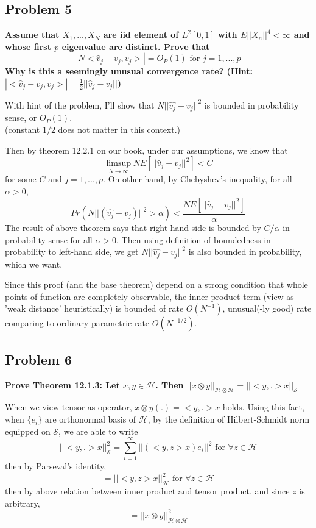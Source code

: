 \documentclass{article}
\begin{document}
\subsection{Problem 5}
\textbf{
Assume that $X_1,...,X_N$ are iid element of $L^2[0,1]$ with
$E||X_n||^4<\infty$ and whose first $p$ eigenvalue are distinct.
Prove that
\[|N<\hat{v}_j-v_j,v_j>|=O_P(1) \text{ for } j=1,...,p\]
Why is this a seemingly unusual convergence rate? 
(Hint: \(|<\hat{v}_j-v_j,v_j>|=\frac{1}{2}||\hat{v}_j-v_j||\))
}

With hint of the problem, I'll show that
\(N||\hat{v_j}-v_j||^2\) is bounded in probability sense, or $O_P(1)$.\\
(constant $1/2$ does not matter in this context.)

Then by theorem 12.2.1 on our book, under our assumptions, we know that
\[\limsup_{N\rightarrow \infty} NE[||\hat{v}_j-v_j||^2]<C\]
for some $C$ and $j=1,...,p$. 
On other hand, by Chebyshev's inequality, for all $\alpha>0$,
\[Pr(N||(\hat{v_j}-v_j)||^2>\alpha)<\frac{NE[||\hat{v}_j-v_j||^2]}{\alpha}\]
The result of above theorem says that right-hand side is bounded by $C/\alpha$ in probability sense for all $\alpha>0$.
Then using definition of boundedness in probability to left-hand side,
we get \(N||\hat{v_j}-v_j||^2\) is also bounded in probability, which we want.

Since this proof (and the base theorem) depend on a strong condition that whole points of function are completely observable, 
the inner product term (view as 'weak distance' heuristically) is bounded of rate $O(N^{-1})$,
unusual(-ly good) rate comparing to ordinary parametric rate $O(N^{-1/2})$. 


\subsection{Problem 6}
\textbf{
Prove Theorem 12.1.3:
Let $x,y\in\mathcal{H}$. Then
\(||x\otimes y||_{\mathcal{H}\otimes\mathcal{H}}=
||<y,.>x||_{\mathcal{S}}\)
}

When we view tensor as operator, \(x\otimes y(.)=<y,.>x\) holds. 
Using this fact, when $\{e_i\}$ are orthonormal basis of $\mathcal{H}$,
by the definition of Hilbert-Schmidt norm equipped on $\mathcal{S}$, we are able to write
\[||<y,.>x||^2_{\mathcal{S}}=\sum_{i=1}^{\infty}||(<y,z>x)e_i||^2 \text{ for } \forall z\in\mathcal{H}\]
then by Parseval's identity,
\[=||<y,z>x||^2_{\mathcal{H}} \text{ for } \forall z\in\mathcal{H}\]
then by above relation between inner product and tensor product, and since $z$ is arbitrary,
\[=||x\otimes y||^2_{\mathcal{H}\otimes\mathcal{H}}\]
\end{document}
